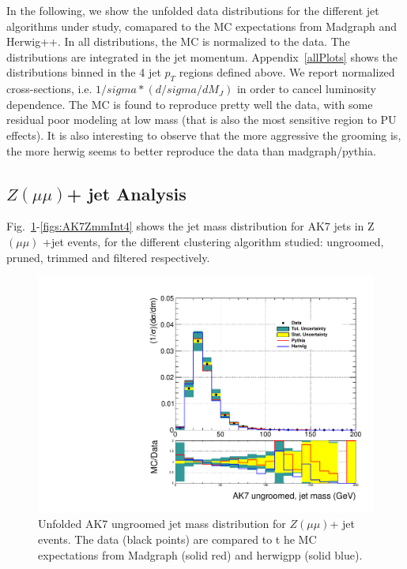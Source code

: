 \clearpage

In the following, we show the unfolded data distributions for the different jet algorithms under study, comapared to the MC expectations from Madgraph and Herwig++. In all distributions, the MC is normalized to the data. The distributions are integrated in the jet momentum. Appendix~\ref{allPlots} shows the distributions binned in the 4 jet $p_T$ regions defined above.
We report normalized cross-sections, i.e. $1/sigma*(d/sigma/dM_J)$ in order to cancel luminosity dependence.
The MC is found to reproduce pretty well the data, with some residual poor modeling at low mass (that is also the most sensitive region to PU effects). It is also interesting to observe that the more aggressive the grooming is, the more herwig seems to better reproduce the data than madgraph/pythia. 


\subsection{$Z(\mu\mu)$+ jet Analysis}

Fig.~\ref{figs:AK7ZmmInt1}-\ref{figs:AK7ZmmInt4} shows the jet mass distribution for AK7 jets in Z$(\mu\mu)$ +jet events, for the different clustering algorithm studied: ungroomed, pruned, trimmed and filtered respectively.  

\begin{figure}[!htb]
\centering\includegraphics[width=1.\textwidth]{figs/Zmm/jetmassunf_ak7_allpT.pdf}
\caption{Unfolded AK7 ungroomed jet mass distribution for $Z(\mu\mu)$+ jet events. The data (black points) are compared to t
he MC expectations from Madgraph (solid red) and herwigpp (solid blue).}
\label{figs:AK7ZmmInt1}
\end{figure}

